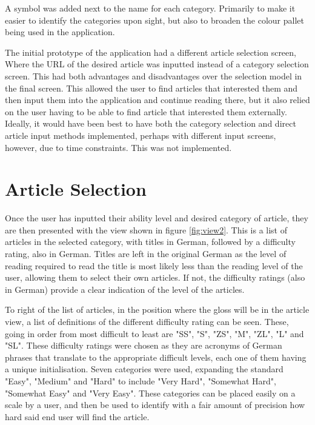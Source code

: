 A symbol was added next to the name for each category. Primarily to make it easier to identify the categories upon sight, but also to broaden the colour pallet being used in the application.

The initial prototype of the application had a different article selection screen, Where the URL of the desired article was inputted instead of a category selection screen. This had both advantages and disadvantages over the selection model in the final screen. This allowed the user to find articles that interested them and then input them into the application and continue reading there, but it also relied on the user having to be able to find article that interested them externally. Ideally, it would have been best to have both the category selection and direct article input methods implemented, perhaps with different input screens, however, due to time constraints. This was not implemented.

\section{Article Selection}

Once the user has inputted their ability level and desired category of article, they are then presented with the view shown in figure \ref{fig:view2}. This is a list of articles in the selected category, with titles in German, followed by a difficulty rating, also in German. Titles are left in the original German as the level of reading required to read the title is most likely less than the reading level of the user, allowing them to select their own articles. If not, the difficulty ratings (also in German) provide a clear indication of the level of the articles. 



To right of the list of articles, in the position where the gloss will be in the article view, a list of definitions of the different difficulty rating can be seen. These, going in order from most difficult to least are "SS", "S", "ZS", "M", "ZL", "L" and "SL". These difficulty ratings were chosen as they are acronyms of German phrases that translate to the appropriate difficult levels, each one of them having a unique initialisation. Seven categories were used, expanding the standard "Easy", "Medium" and "Hard" to include "Very Hard", "Somewhat Hard", "Somewhat Easy" and "Very Easy". These categories can be placed easily on a scale by a user, and then be used to identify with a fair amount  of precision how hard said end user will find the article.

